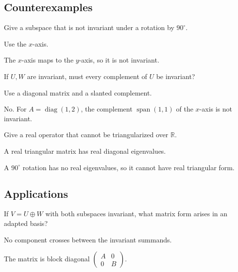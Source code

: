 \subsection*{Counterexamples}

\begin{exercise}\label{exr:i10-expand-10}
Give a subspace that is not invariant under a rotation by \(90^\circ\).
\end{exercise}
\begin{hint}
Use the \(x\)-axis.
\end{hint}
\begin{solution}
The \(x\)-axis maps to the \(y\)-axis, so it is not invariant.
\end{solution}

\begin{exercise}\label{exr:i10-expand-11}
If \(U,W\) are invariant, must every complement of \(U\) be invariant?
\end{exercise}
\begin{hint}
Use a diagonal matrix and a slanted complement.
\end{hint}
\begin{solution}
No. For \(A=\operatorname{diag}(1,2)\), the complement \(\operatorname{span}(1,1)\) of the \(x\)-axis is not invariant.
\end{solution}

\begin{exercise}\label{exr:i10-expand-12}
Give a real operator that cannot be triangularized over \(\mathbb R\).
\end{exercise}
\begin{hint}
A real triangular matrix has real diagonal eigenvalues.
\end{hint}
\begin{solution}
A \(90^\circ\) rotation has no real eigenvalues, so it cannot have real triangular form.
\end{solution}

\subsection*{Applications}

\begin{exercise}\label{exr:i10-expand-13}
If \(V=U\oplus W\) with both subspaces invariant, what matrix form arises in an adapted basis?
\end{exercise}
\begin{hint}
No component crosses between the invariant summands.
\end{hint}
\begin{solution}
The matrix is block diagonal \(\begin{pmatrix}A&0\\0&B\end{pmatrix}\).
\end{solution}

